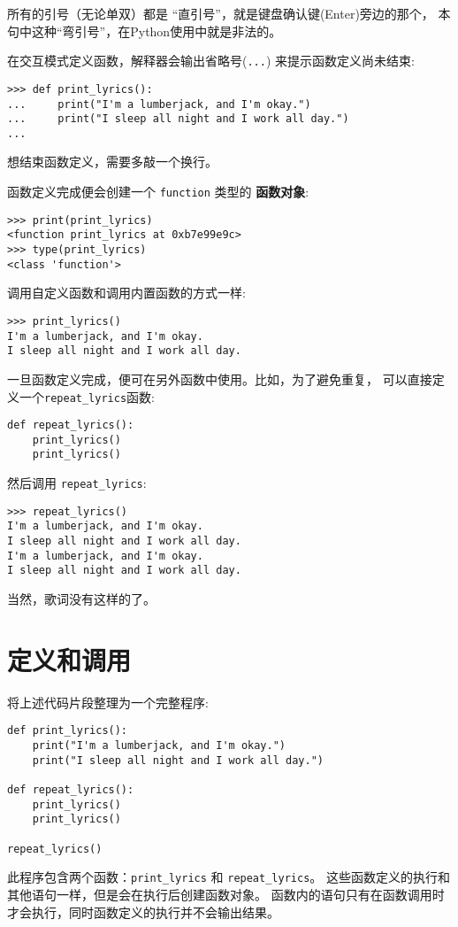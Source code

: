 \documentclass[10pt]{book}
\begin{document}
所有的引号（无论单双）都是 ``直引号''，就是键盘确认键(Enter)旁边的那个，
本句中这种``弯引号''，在Python使用中就是非法的。

在交互模式定义函数，解释器会输出省略号({\tt ...}) 来提示函数定义尚未结束:

\begin{verbatim}
>>> def print_lyrics():
...     print("I'm a lumberjack, and I'm okay.")
...     print("I sleep all night and I work all day.")
...
\end{verbatim}
%
想结束函数定义，需要多敲一个换行。

函数定义完成便会创建一个 \verb"function" 类型的 {\bf 函数对象}:

\begin{verbatim}
>>> print(print_lyrics)
<function print_lyrics at 0xb7e99e9c>
>>> type(print_lyrics)
<class 'function'>
\end{verbatim}
%
调用自定义函数和调用内置函数的方式一样:

\begin{verbatim}
>>> print_lyrics()
I'm a lumberjack, and I'm okay.
I sleep all night and I work all day.
\end{verbatim}
%
一旦函数定义完成，便可在另外函数中使用。比如，为了避免重复，
可以直接定义一个\verb"repeat_lyrics"函数:

\begin{verbatim}
def repeat_lyrics():
    print_lyrics()
    print_lyrics()
\end{verbatim}
%
然后调用 \verb"repeat_lyrics":

\begin{verbatim}
>>> repeat_lyrics()
I'm a lumberjack, and I'm okay.
I sleep all night and I work all day.
I'm a lumberjack, and I'm okay.
I sleep all night and I work all day.
\end{verbatim}
%
当然，歌词没有这样的了。

\section{定义和调用}

将上述代码片段整理为一个完整程序:

\begin{verbatim}
def print_lyrics():
    print("I'm a lumberjack, and I'm okay.")
    print("I sleep all night and I work all day.")

def repeat_lyrics():
    print_lyrics()
    print_lyrics()

repeat_lyrics()
\end{verbatim}
%
此程序包含两个函数：\verb"print_lyrics" 和 \verb"repeat_lyrics"。
这些函数定义的执行和其他语句一样，但是会在执行后创建函数对象。
函数内的语句只有在函数调用时才会执行，同时函数定义的执行并不会输出结果。
\end{document}
